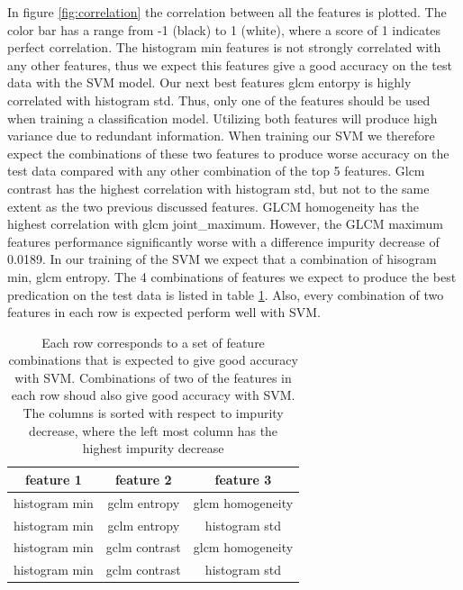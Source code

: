 In figure \ref{fig:correlation} the correlation between all the features is
plotted. The color bar has a range from -1 (black) to 1 (white), where a score
of 1 indicates perfect correlation. The histogram min features is not strongly
correlated with any other features, thus we expect this features give a good
accuracy on the test data with the SVM model. Our next best features glcm
entorpy is highly correlated with histogram std. Thus, only one of the features
should be used when training a classification model. Utilizing both features
will produce high variance due to redundant information. When training our SVM
we therefore expect the combinations of these two features to produce worse
accuracy on the test data compared with any other combination of the top 5
features. Glcm contrast has the highest correlation with histogram std, but not
to the same extent as the two previous discussed features. GLCM homogeneity has
the highest correlation with glcm joint\_maximum. However, the GLCM maximum
features performance significantly worse with a difference impurity decrease of
0.0189. In our training of the SVM we expect that a combination of hisogram
min, glcm entropy. The 4 combinations of features we expect to
produce the best predication on the test data is listed in table
\ref{tab:expectation}. Also, every combination of two features in each row is
expected perform well with SVM. 

\begin{table}
    \centering
    \caption{Each row corresponds to a set of feature combinations that is
        expected to give good accuracy with SVM. Combinations of two of the features
    in each row shoud also give good accuracy with SVM. The columns is sorted
with respect to impurity decrease, where the left most column has the highest
impurity decrease}  
    \label{tab:expectation} 
    \begin{tabular}{|c|c|c|}
        \hline
        feature 1 & feature 2 & feature 3 \\
        \hline
        histogram min & gclm entropy & glcm homogeneity \\ 
        histogram min & gclm entropy & histogram std  \\ 
        histogram min & gclm contrast & glcm homogeneity \\ 
        histogram min & gclm contrast & histogram std  \\ 
        \hline
    \end{tabular} 
\end{table}

